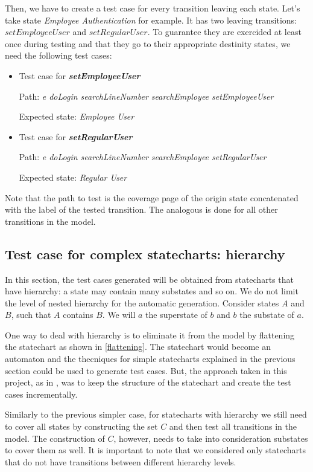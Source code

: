 Then, we have to create a test case for every transition leaving each state. Let's take state \textit{Employee Authentication} for example. It has two leaving transitions: $setEmployeeUser$ and $setRegularUser$. To guarantee they are exercided at least once during testing and that they go to their appropriate destinity states, we need the following test cases:

\begin{itemize}

\item Test case for \textit{\textbf{setEmployeeUser}}

Path: \textit{e doLogin searchLineNumber searchEmployee setEmployeeUser}

Expected state: \textit{Employee User}

\item Test case for \textit{\textbf{setRegularUser}}

Path: \textit{e doLogin searchLineNumber searchEmployee setRegularUser}

Expected state: \textit{Regular User}
\end{itemize}

Note that the path to test is the coverage page of the origin state concatenated with the label of the tested transition. The analogous is done for all other transitions in the model.

\subsection{Test case for complex statecharts: hierarchy}


In this section, the test cases generated will be obtained from statecharts that have hierarchy: a state may contain many substates and so on. We do not limit the level of nested hierarchy for the automatic generation. Consider states $A$ and $B$, such that $A$ contains $B$. We will $a$ the superstate of $b$ and $b$ the substate of $a$.

One way to deal with hierarchy is to eliminate it from the model by flattening the statechart as shown in \ref{flattening}. The statechart would become an automaton and the thecniques for simple statecharts explained in the previous section could be used to generate test cases. But, the approach taken in this project, as in \cite{bogdanov}, was to keep the structure of the statechart and create the test cases incrementally.

Similarly to the previous simpler case, for statecharts with hierarchy we still need to cover all states by constructing the set $C$ and then test all transitions in the model. The construction of $C$, however, needs to take into consideration substates to cover them as well. It is important to note that we considered only statecharts that do not have transitions between different hierarchy levels. 

